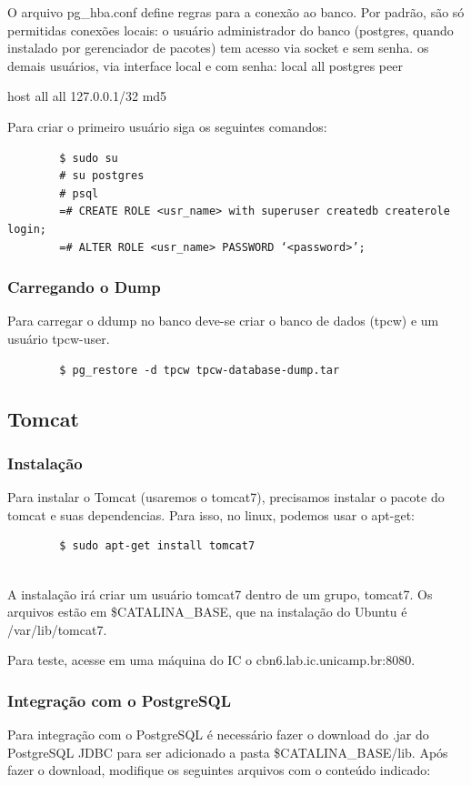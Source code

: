 \documentclass[a4paper,10pt]{article}
\begin{document}
    O arquivo pg\_hba.conf define regras para a conexão ao banco. Por padrão, são só permitidas conexões locais: o usuário administrador do banco (postgres, quando instalado por gerenciador de pacotes) tem acesso via socket e sem senha. os demais usuários, via interface local e com senha:
    local   all             postgres                                peer

host    all             all             127.0.0.1/32            md5

Para criar o primeiro usuário siga os seguintes comandos:
    \begin{verbatim}
        $ sudo su
        # su postgres
        # psql
        =# CREATE ROLE <usr_name> with superuser createdb createrole login;
        =# ALTER ROLE <usr_name> PASSWORD ‘<password>’;
    \end{verbatim}
    
    \subsubsection{Carregando o Dump}
    Para carregar o ddump no banco deve-se criar o banco de dados (tpcw) e um usuário tpcw-user.
    \begin{verbatim}
        $ pg_restore -d tpcw tpcw-database-dump.tar
    \end{verbatim}
    
    
    \subsection{Tomcat}
        \subsubsection{Instalação}
        Para instalar o Tomcat (usaremos o tomcat7), precisamos instalar o pacote do tomcat e suas dependencias. Para isso, no linux, podemos usar o apt-get:
        \begin{verbatim}
        $ sudo apt-get install tomcat7
        
        \end{verbatim}
        A instalação irá criar um usuário tomcat7 dentro de um grupo, tomcat7. Os arquivos estão em \$CATALINA\_BASE, que na instalação do Ubuntu é /var/lib/tomcat7.

        Para teste, acesse em uma máquina do IC o cbn6.lab.ic.unicamp.br:8080.
        
        \subsubsection{Integração com o PostgreSQL}
        Para integração com o PostgreSQL é necessário fazer o download do .jar do PostgreSQL JDBC para ser adicionado a pasta \$CATALINA\_BASE/lib. Após fazer o download, modifique os seguintes arquivos com o conteúdo indicado:
\end{document}
